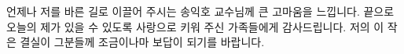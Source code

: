 
\acknowledgment[1]
언제나 저를 바른 길로 이끌어 주시는 송익호 교수님께 큰 고마움을 느낍니다.
끝으로 오늘의 제가 있을 수 있도록 사랑으로 키워 주신 가족들에게 감사드립니다.
저의 이 작은 결실이 그분들께 조금이나마 보답이 되기를 바랍니다.